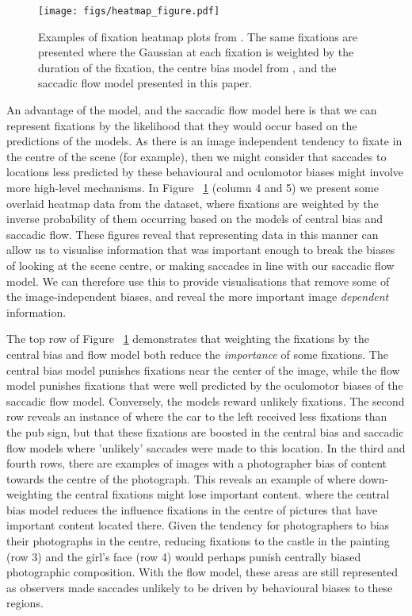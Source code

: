 \begin{figure}
\centering
\texttt{[image: figs/heatmap\_figure.pdf]}
\caption{Examples of fixation heatmap plots from \cite{clarke2013}. The same fixations are presented where the Gaussian at each fixation is weighted by the duration of the fixation, the centre bias model from \citep{clarke-tatler2014} , and the saccadic flow model presented in this paper.}
\label{fig:adjustedHeatmaps}
\end{figure}

An advantage of the \citet{clarke-tatler2014} model, and the saccadic flow model here is that we can represent fixations by the likelihood that they would occur based on the predictions of the models. As there is an image independent tendency to fixate in the centre of the scene (for example), then we might consider that saccades to locations less predicted by these behavioural and oculomotor biases might involve more high-level mechanisms. In Figure ~\ref{fig:adjustedHeatmaps} (column 4 and 5) we present some overlaid heatmap data from the \citet{clarke2013} dataset, where fixations are weighted by the inverse probability of them occurring based on the models of central bias and saccadic flow. These figures reveal that representing data in this manner can allow us to visualise information that was important enough to break the biases of looking at the scene centre, or making saccades in line with our saccadic flow model. We can therefore use this to provide visualisations that remove some of the image-independent biases, and reveal the more important image \emph{dependent} information.


The top row of Figure ~\ref{fig:adjustedHeatmaps} demonstrates that weighting the fixations by the central bias and flow model both reduce the \emph{importance} of some fixations. The central bias model punishes fixations near the center of the image, while the flow model punishes fixations that were well predicted by the oculomotor biases of the saccadic flow model. Conversely, the models reward unlikely fixations. The second row reveals an instance of where the car to the left received less fixations than the pub sign, but that these fixations are boosted in the central bias and saccadic flow models where 'unlikely' saccades were made to this location. In the third and fourth rows, there are examples of images with a photographer bias of content towards the centre of the photograph. This reveals an example of where down-weighting the central fixations might lose important content.
where the central bias model reduces the influence fixations in the centre of pictures that have important content located there. Given the tendency for photographers to bias their photographs in the centre, reducing fixations to the castle in the painting (row 3) and the girl's face (row 4) would perhaps punish centrally biased photographic composition. With the flow model, these areas are still represented as observers made saccades unlikely to be driven by behavioural biases to these regions.

